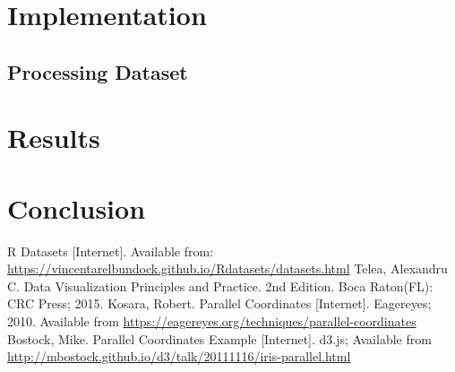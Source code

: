 \documentclass[]{article}
\begin{document}
\section{Implementation}
	\subsection{Processing Dataset}
	
\section{Results}

\section{Conclusion}

\begin{thebibliography}{11}
		R Datasets [Internet]. Available from: \url{https://vincentarelbundock.github.io/Rdatasets/datasets.html}
		Telea, Alexandru C. Data Visualization Principles and Practice. 2nd Edition. Boca Raton(FL): CRC Press; 2015.
		Kosara, Robert. Parallel Coordinates [Internet]. Eagereyes; 2010. Available from \url{https://eagereyes.org/techniques/parallel-coordinates}
		Bostock, Mike. Parallel Coordinates Example [Internet]. d3.js; Available from \url{http://mbostock.github.io/d3/talk/20111116/iris-parallel.html}
\end{thebibliography}
\end{document}

